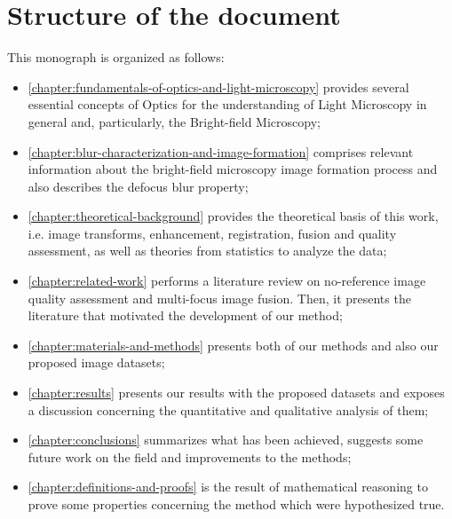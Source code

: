 \section*{Structure of the document}

This monograph is organized as follows:

\begin{itemize}
    \item \autoref{chapter:fundamentals-of-optics-and-light-microscopy} provides several essential concepts of Optics for the understanding of Light Microscopy in general and, particularly, the Bright-field Microscopy;
    
    \item \autoref{chapter:blur-characterization-and-image-formation} comprises relevant information about the bright-field microscopy image formation process and also describes the defocus blur property;
    
    \item \autoref{chapter:theoretical-background} provides the theoretical basis of this work, i.e. image transforms, enhancement, registration, fusion and quality assessment, as well as theories from statistics to analyze the data;
    
    \item \autoref{chapter:related-work} performs a literature review on no-reference image quality assessment and multi-focus image fusion. Then, it presents the literature that motivated the development of our method;
    
    \item \autoref{chapter:materials-and-methods} presents both of our methods and also our proposed image datasets;
    
    \item \autoref{chapter:results} presents our results with the proposed datasets and exposes a discussion concerning the quantitative and qualitative analysis of them;
    
    \item \autoref{chapter:conclusions} summarizes what has been achieved, suggests some future work on the field and improvements to the methods;
    
    \item \autoref{chapter:definitions-and-proofs} is the result of mathematical reasoning to prove some properties concerning the method which were hypothesized true.
    
\end{itemize}
